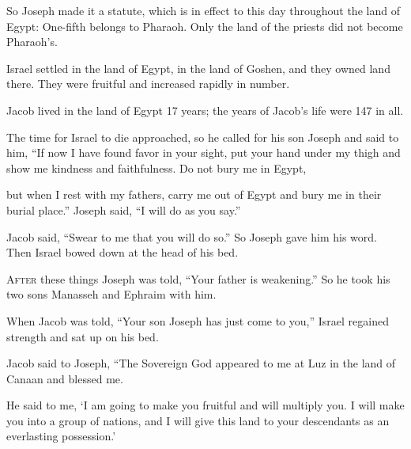 \begin{scripture}
 So Joseph made it a statute, which is in effect to this day throughout the land of Egypt: One-fifth belongs to Pharaoh. Only the land of the priests did not become Pharaoh's.
\everypar{}

 Israel settled in the land of Egypt, in the land of Goshen, and they owned land there. They were fruitful and increased rapidly in number.
\everypar{}

 Jacob lived in the land of Egypt 17 years; the years of Jacob's life were 147 in all.
 The time for Israel to die approached, so he called for his son Joseph and said to him, ``If now I have found favor in your sight, put your hand under my thigh and show me kindness and faithfulness. Do not bury me in Egypt,
 but when I rest with my fathers, carry me out of Egypt and bury me in their burial place.'' Joseph said, ``I will do as you say.''
\everypar{}

 Jacob said, ``Swear to me that you will do so.'' So Joseph gave him his word. Then Israel bowed down at the head of his bed.

 \allowchapbreak\hypertarget{ch-genesis-48}{}\lettrine[lines=5]{\color{pentateuch}A}{\textsc{fter}} these things Joseph was told, ``Your father is weakening.'' So he took his two sons Manasseh and Ephraim with him.\everypar{}
 When Jacob was told, ``Your son Joseph has just come to you,'' Israel regained strength and sat up on his bed.
 Jacob said to Joseph, ``The Sovereign God appeared to me at Luz in the land of Canaan and blessed me.
 He said to me, `I am going to make you fruitful and will multiply you. I will make you into a group of nations, and I will give this land to your descendants as an everlasting possession.'
\everypar{}


\end{scripture}
